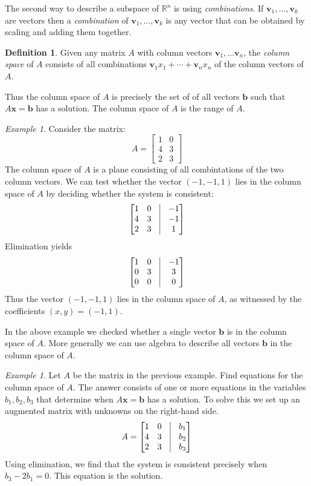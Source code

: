 \documentclass[11pt,oneside]{amsbook}
\newcommand{\R}{\mathbb R}
\theoremstyle{definition}
\theoremstyle{plain}
\theoremstyle{definition}
\newtheorem{definition}[theorem]{Definition}
\theoremstyle{remark}
\newtheorem{example}[theorem]{Example}
\numberwithin{equation}{section}
\numberwithin{figure}{section}
\begin{document}
The second way to describe a subspace of $\R^n$ is using \emph{combinations}. If $\textbf{v}_1,\ldots,\textbf{v}_k$ are vectors then a \emph{combination} of $\textbf{v}_1,\ldots,\textbf{v}_k$ is any vector that can be obtained by scaling and adding them together.

\begin{definition}
  Given any matrix $A$ with column vectors $\bm{v}_1,\ldots\bm{v}_n$, the \emph{column space} of $A$ consists of all combinations $\bm{v}_1x_1+\cdots+\bm{v}_nx_n$ of the column vectors of $A$.
\end{definition}

Thus the column space of $A$ is precisely the set of of all vectors $\bm{b}$ such that $A\bm{x}=\bm{b}$ has a solution. The column space of $A$ is the range of $A$.

\begin{example}
  Consider the matrix:
  \[A=\begin{bmatrix}1&0\\4&3\\2&3\end{bmatrix}
  \]
  The column space of $A$ is a plane consisting of all combintations of the two column vectors. We can test whether the vector $(-1,-1,1)$ lies in the column space of $A$ by deciding whether the system is consistent:
  \[\begin{bmatrix}1&0&\vline&-1\\4&3&\vline&-1\\2&3&\vline&1\end{bmatrix}
  \]
  Elimination yields
  \[\begin{bmatrix}1&0&\vline&-1\\0&3&\vline&3\\0&0&\vline&0\end{bmatrix}
  \]  
  Thus the vector $(-1,-1,1)$ lies in the column space of $A$, as witnessed by the coefficients $(x,y)=(-1,1)$.
\end{example}

In the above example we checked whether a single vector $\bm{b}$ is in the column space of $A$. More generally we can use algebra to describe all vectors $\bm{b}$ in the column space of $A$.

\begin{example}
  Let $A$ be the matrix in the previous example. Find equations for the column space of $A$. The answer consists of one or more equations in the variables $b_1,b_2,b_3$ that determine when $A\bm{x}=\bm{b}$ has a solution. To solve this we set up an augmented matrix with unknowns on the right-hand side.
  \[A=\begin{bmatrix}
      1&0&\vline&b_1\\
      4&3&\vline&b_2\\
      2&3&\vline&b_3\\
    \end{bmatrix}
  \]
  Using elimination, we find that the system is consistent precisely when $b_3-2b_1=0$. This equation is the solution.
\end{example}
\end{document}
